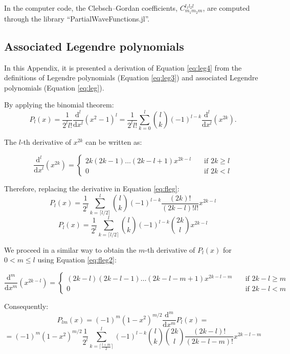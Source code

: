 \documentclass[12pt]{article}
\begin{document}
In the computer code, the Clebsch–Gordan coefficients, $C_{{m_1}{m_2}m}^{{l_1}{l_2}l}$, are computed through the library ``PartialWaveFunctions.jl''.


\begin{appendix}
\section{Associated Legendre polynomials}
\label{app:legendre}
    
In this Appendix, it is presented a derivation of Equation \ref{eq:leg4} from the definitions of Legendre polynomials (Equation \ref{eq:leg3}) and associated Legendre polynomials (Equation \ref{eq:leg}).

By applying the binomial theorem:
\begin{equation}
    \label{eq:fleg}
    P_l(x)= \frac{1}{2^l l!} \frac{\mathrm{d}^l}{\mathrm{d}x^l}(x^2-1)^l = \frac{1}{2^l l!} \sum_{k=0}^l {l \choose k} (-1)^{l-k} \frac{\mathrm{d}^l}{\mathrm{d}x^l}(x^{2k}).
\end{equation}

The $l$-th derivative of $x^{2k}$ can be written as:

\[ \frac{\mathrm{d}^l}{\mathrm{d}x^l}(x^{2k}) =
  \begin{cases}
    2k (2k-1) \ldots (2k-l+1) x^{2k-l}      & \quad \text{if } 2k \ge l \\
    0 & \quad \text{if } 2k < l
  \end{cases}
\]

Therefore, replacing the derivative in Equation \ref{eq:fleg}:
\begin{equation*}
    P_l(x) = \frac{1}{2^l} \sum_{k=\lceil l/2 \rceil}^l {l \choose k} (-1)^{l-k} \frac{(2k)!}{(2k-l)! l!} x^{2k-l}
\end{equation*}
\begin{equation}
    \label{eq:fleg2}
    P_l(x) = \frac{1}{2^l} \sum_{k=\lceil l/2 \rceil}^l {l \choose k} (-1)^{l-k} {2k \choose l} x^{2k-l}
\end{equation}

We proceed in a similar way to obtain the $m$-th derivative of $P_l(x)$ for $0 < m \le l$ using Equation \ref{eq:fleg2}:

\[ \frac{\mathrm{d}^m}{\mathrm{d}x^m}(x^{2k-l}) =
  \begin{cases}
    (2k-l) (2k-l-1) \ldots (2k-l-m+1) x^{2k-l-m}      & \quad \text{if } 2k-l \ge m \\
    0 & \quad \text{if } 2k -l < m
  \end{cases}
\]

Consequently:
\begin{equation*}
    P_{lm}(x)=(-1)^m (1-x^2)^{m/2} \frac{\mathrm{d}^m}{\mathrm{d}x^m} P_l(x) = 
\end{equation*}
\begin{equation*}
     = (-1)^m (1-x^2)^{m/2} \frac{1}{2^l} \sum_{k = \lceil \frac{l+m}{2} \rceil}^{l} (-1)^{l-k} {l \choose k} {2k \choose l} \frac{(2k-l)!}{(2k-l-m)!} x^{2k-l-m}
\end{equation*}

\end{appendix}
\end{document}
